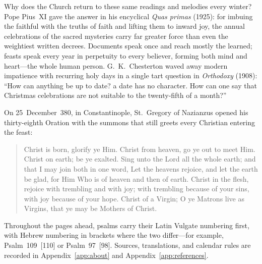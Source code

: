 Why does the Church return to these same readings and melodies every winter?
Pope Pius~XI gave the answer in his encyclical \textit{Quas primas} (1925): for
imbuing the faithful with the truths of faith and lifting them to inward joy,
the annual celebrations of the sacred mysteries carry far greater force than
even the weightiest written decrees. Documents speak once and reach mostly the
learned; feasts speak every year in perpetuity to every believer, forming both
mind and heart---the whole human person. G.~K.~Chesterton waved away modern
impatience with recurring holy days in a single tart question in
\textit{Orthodoxy} (1908): ``How can anything be up to date? a date has no
character. How can one say that Christmas celebrations are not suitable to the
twenty-fifth of a month?''

On 25~December~380, in Constantinople, St.~Gregory of Nazianzus opened his
thirty-eighth Oration with the summons that still greets every Christian
entering the feast:

\begin{quote}
Christ is born, glorify ye Him. Christ from heaven, go ye out to meet Him.
Christ on earth; be ye exalted. Sing unto the Lord all the whole earth; and
that I may join both in one word, Let the heavens rejoice, and let the earth be
glad, for Him Who is of heaven and then of earth. Christ in the flesh, rejoice
with trembling and with joy; with trembling because of your sins, with joy
because of your hope. Christ of a Virgin; O ye Matrons live as Virgins, that ye
may be Mothers of Christ.
\end{quote}

Throughout the pages ahead, psalms carry their Latin Vulgate numbering first,
with Hebrew numbering in brackets where the two differ---for example,
Psalm~109~[110] or Psalm~97~[98]. Sources, translations, and calendar rules are
recorded in Appendix~\ref{app:about} and Appendix~\ref{app:references}.
